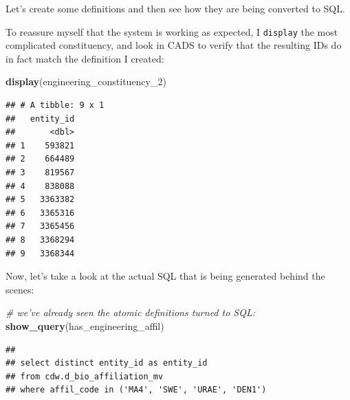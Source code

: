 \documentclass[]{book}
\newenvironment{Shaded}{\begin{snugshade}}{\end{snugshade}}
\newcommand{\CommentTok}[1]{\textcolor[rgb]{0.56,0.35,0.01}{\textit{#1}}}
\newcommand{\DecValTok}[1]{\textcolor[rgb]{0.00,0.00,0.81}{#1}}
\newcommand{\KeywordTok}[1]{\textcolor[rgb]{0.13,0.29,0.53}{\textbf{#1}}}
\newcommand{\NormalTok}[1]{#1}
\newcommand{\OperatorTok}[1]{\textcolor[rgb]{0.81,0.36,0.00}{\textbf{#1}}}
\newcommand{\StringTok}[1]{\textcolor[rgb]{0.31,0.60,0.02}{#1}}
\begin{document}
Let's create some definitions and then see how they are being converted to SQL.

\begin{Shaded}
\end{Shaded}

To reassure myself that the system is working as expected, I \texttt{display} the most complicated constituency, and look in CADS to verify that the resulting IDs do in fact match the definition I created:

\begin{Shaded}
\begin{Highlighting}[]
\KeywordTok{display}\NormalTok{(engineering_constituency_}\DecValTok{2}\NormalTok{)}
\end{Highlighting}
\end{Shaded}

\begin{verbatim}
## # A tibble: 9 x 1
##   entity_id
##       <dbl>
## 1    593821
## 2    664489
## 3    819567
## 4    838088
## 5   3363382
## 6   3365316
## 7   3365456
## 8   3368294
## 9   3368344
\end{verbatim}

Now, let's take a look at the actual SQL that is being generated behind the scenes:

\begin{Shaded}
\begin{Highlighting}[]
\CommentTok{# we've already seen the atomic definitions turned to SQL:}
\KeywordTok{show_query}\NormalTok{(has_engineering_affil)}
\end{Highlighting}
\end{Shaded}

\begin{verbatim}
## 
## select distinct entity_id as entity_id
## from cdw.d_bio_affiliation_mv
## where affil_code in ('MA4', 'SWE', 'URAE', 'DEN1')
\end{verbatim}
\end{document}
